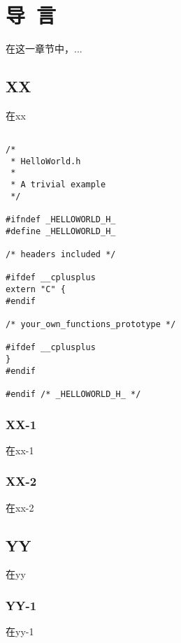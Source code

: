 \chapter{导~言}
在这一章节中，...

\section{XX}
在xx

\begin{center}
\begin{lstlisting}[caption={An Example}]

/*
 * HelloWorld.h
 *
 * A trivial example
 */

#ifndef _HELLOWORLD_H_
#define _HELLOWORLD_H_

/* headers included */

#ifdef __cplusplus
extern "C" {
#endif

/* your_own_functions_prototype */

#ifdef __cplusplus
}
#endif

#endif /* _HELLOWORLD_H_ */
\end{lstlisting}

\end{center}

\subsection{XX-1}
在xx-1
\subsection{XX-2}
在xx-2

\section{YY}
在yy
\subsection{YY-1}
在yy-1
